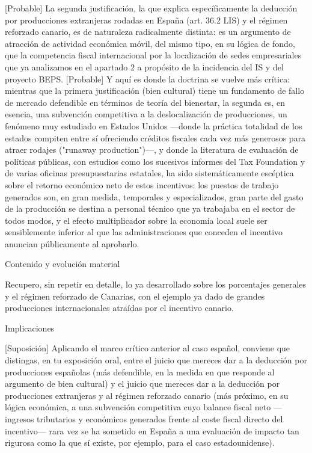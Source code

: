 \documentclass[10pt,a4paper]{article}
\begin{document}
[Probable] La segunda justificación, la que explica específicamente la deducción por producciones extranjeras rodadas en España (art. 36.2 LIS) y el régimen reforzado canario, es de naturaleza radicalmente distinta: es un argumento de atracción de actividad económica móvil, del mismo tipo, en su lógica de fondo, que la competencia fiscal internacional por la localización de sedes empresariales que ya analizamos en el apartado 2 a propósito de la incidencia del IS y del proyecto BEPS. [Probable] Y aquí es donde la doctrina se vuelve más crítica: mientras que la primera justificación (bien cultural) tiene un fundamento de fallo de mercado defendible en términos de teoría del bienestar, la segunda es, en esencia, una subvención competitiva a la deslocalización de producciones, un fenómeno muy estudiado en Estados Unidos —donde la práctica totalidad de los estados compiten entre sí ofreciendo créditos fiscales cada vez más generosos para atraer rodajes ("runaway production")—, y donde la literatura de evaluación de políticas públicas, con estudios como los sucesivos informes del Tax Foundation y de varias oficinas presupuestarias estatales, ha sido sistemáticamente escéptica sobre el retorno económico neto de estos incentivos: los puestos de trabajo generados son, en gran medida, temporales y especializados, gran parte del gasto de la producción se destina a personal técnico que ya trabajaba en el sector de todos modos, y el efecto multiplicador sobre la economía local suele ser sensiblemente inferior al que las administraciones que conceden el incentivo anuncian públicamente al aprobarlo.

Contenido y evolución material

Recupero, sin repetir en detalle, lo ya desarrollado sobre los porcentajes generales y el régimen reforzado de Canarias, con el ejemplo ya dado de grandes producciones internacionales atraídas por el incentivo canario.

Implicaciones

[Suposición] Aplicando el marco crítico anterior al caso español, conviene que distingas, en tu exposición oral, entre el juicio que mereces dar a la deducción por producciones españolas (más defendible, en la medida en que responde al argumento de bien cultural) y el juicio que mereces dar a la deducción por producciones extranjeras y al régimen reforzado canario (más próximo, en su lógica económica, a una subvención competitiva cuyo balance fiscal neto —ingresos tributarios y económicos generados frente al coste fiscal directo del incentivo— rara vez se ha sometido en España a una evaluación de impacto tan rigurosa como la que sí existe, por ejemplo, para el caso estadounidense).
\end{document}
